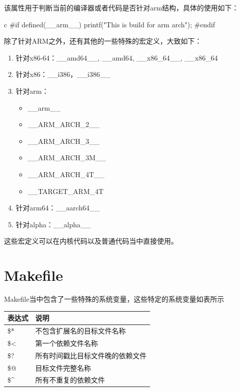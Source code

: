 \begin{outline}[enumerate]
该属性用于判断当前的编译器或者代码是否针对arm结构，具体的使用如下：
\begin{code-block}{c}
#if defined(__arm__)
        printf("This is build for arm arch\n");
#endif
\end{code-block}
除了针对ARM之外，还有其他的一些特殊的宏定义，大致如下：
\begin{enumerate}
  \item 针对x86-64：\_\_amd64\_\_, \_\_amd64, \_\_x86\_64\_\_, \_\_x86\_64
  \item 针对x86：\_\_i386，\_\_i386\_\_
  \item 针对arm：
  \begin{itemize}
  \item \_\_arm\_\_
  \item \_\_ARM\_ARCH\_2\_\_
  \item \_\_ARM\_ARCH\_3\_\_
  \item \_\_ARM\_ARCH\_3M\_\_
  \item \_\_ARM\_ARCH\_4T\_\_
  \item \_\_TARGET\_ARM\_4T
  \end{itemize}
  \item 针对arm64：\_\_aarch64\_\_
  \item 针对alpha：\_\_alpha\_\_
\end{enumerate}
这些宏定义可以在内核代码以及普通代码当中直接使用。

\end{outline}

\section{Makefile}
Makefile当中包含了一些特殊的系统变量，这些特定的系统变量如表所示
\begin{center}
  \begin{tabularx}{\textwidth}{|X|X|}
  \hline
  表达式& 说明\\ \hline
  \$* & 不包含扩展名的目标文件名称 \\
  \$< & 第一个依赖文件名称\\
  \$? & 所有时间戳比目标文件晚的依赖文件\\
  \$@ & 目标文件完整名称\\
  \$\^{} & 所有不重复的依赖文件\\ \hline
  \end{tabularx}
  \label{tab:macro_of_makefile}
\end{center}

